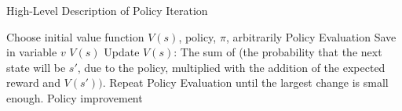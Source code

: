 \begin{algorithm}                                        

\caption{High-Level Description of Policy Iteration}
\label{policy_iteration_high_level}

\begin{algorithmic}
    \State Choose initial value function $V(s)$, policy, $\pi$, arbitrarily
    \State Policy Evaluation
        \State Save in variable $v$ $V(s)$
        \State Update $V(s)$: The sum of (the probability that 
        the next state will be $s'$, due to the policy, multiplied
        with the addition of the expected reward and $V(s'))$. 
	    \State Repeat Policy Evaluation until the largest change is small enough.  
    \EndFor
    \State Policy improvement
    
\end{algorithmic}
\end{algorithm}

\begin{comment}
Initialization
    Choose your initial value function, V(s)
    and policy, pi arbitrarily
Policy Evaluation
  For every state s:
    Save in variable v V(s)
    Update V(s) with: The sum of (the probability that 
    the next state will be s’, due to the policy, multiplied
    with the addition of the expected reward and V(s’)). 
	Repeat Policy Evaluation until the largest change is small enough.  
Policy Improvement
	For every state s: 
		Update the policy of that state the action which generate the most 
		expected reward + value function.
\end{comment}